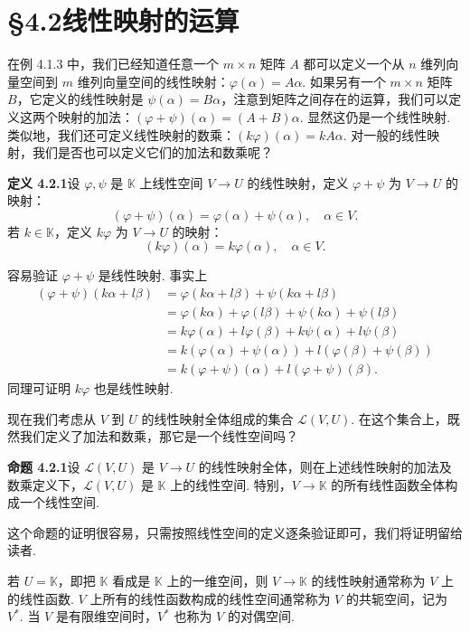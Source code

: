 \documentclass[UTF8,12pt,a4paper,fontset=fandol]{ctexart}
\begin{document}
\section*{§4.2\quad 线性映射的运算}

在例 4.1.3 中，我们已经知道任意一个 $m\times n$ 矩阵 $A$ 都可以定义一个从 $n$ 维列向量空间到 $m$ 维列向量空间的线性映射：$\varphi(\alpha)=A\alpha$. 如果另有一个 $m\times n$ 矩阵 $B$，它定义的线性映射是 $\psi(\alpha)=B\alpha$，注意到矩阵之间存在的运算，我们可以定义这两个映射的加法：$(\varphi+\psi)(\alpha)=(A+B)\alpha$. 显然这仍是一个线性映射. 类似地，我们还可定义线性映射的数乘：$(k\varphi)(\alpha)=kA\alpha$. 对一般的线性映射，我们是否也可以定义它们的加法和数乘呢？

\noindent\textbf{定义 4.2.1}\quad 设 $\varphi,\psi$ 是 $\mathbb{K}$ 上线性空间 $V\to U$ 的线性映射，定义 $\varphi+\psi$ 为 $V\to U$ 的映射：
\[
(\varphi+\psi)(\alpha)=\varphi(\alpha)+\psi(\alpha),\quad \alpha\in V.
\]
若 $k\in\mathbb{K}$，定义 $k\varphi$ 为 $V\to U$ 的映射：
\[
(k\varphi)(\alpha)=k\varphi(\alpha),\quad \alpha\in V.
\]

容易验证 $\varphi+\psi$ 是线性映射. 事实上
\[
\begin{aligned}
(\varphi+\psi)(k\alpha+l\beta)
&=\varphi(k\alpha+l\beta)+\psi(k\alpha+l\beta)\\
&=\varphi(k\alpha)+\varphi(l\beta)+\psi(k\alpha)+\psi(l\beta)\\
&=k\varphi(\alpha)+l\varphi(\beta)+k\psi(\alpha)+l\psi(\beta)\\
&=k(\varphi(\alpha)+\psi(\alpha))+l(\varphi(\beta)+\psi(\beta))\\
&=k(\varphi+\psi)(\alpha)+l(\varphi+\psi)(\beta).
\end{aligned}
\]
同理可证明 $k\varphi$ 也是线性映射.

现在我们考虑从 $V$ 到 $U$ 的线性映射全体组成的集合 $\mathcal{L}(V,U)$. 在这个集合上，既然我们定义了加法和数乘，那它是一个线性空间吗？

\noindent\textbf{命题 4.2.1}\quad 设 $\mathcal{L}(V,U)$ 是 $V\to U$ 的线性映射全体，则在上述线性映射的加法及数乘定义下，$\mathcal{L}(V,U)$ 是 $\mathbb{K}$ 上的线性空间. 特别，$V\to\mathbb{K}$ 的所有线性函数全体构成一个线性空间.

这个命题的证明很容易，只需按照线性空间的定义逐条验证即可，我们将证明留给读者.

若 $U=\mathbb{K}$，即把 $\mathbb{K}$ 看成是 $\mathbb{K}$ 上的一维空间，则 $V\to\mathbb{K}$ 的线性映射通常称为 $V$ 上的线性函数. $V$ 上所有的线性函数构成的线性空间通常称为 $V$ 的共轭空间，记为 $V^*$. 当 $V$ 是有限维空间时，$V^*$ 也称为 $V$ 的对偶空间.
\end{document}
